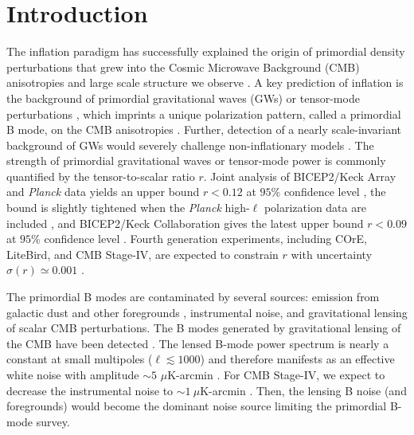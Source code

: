 \documentclass[iop,apj, numberedappendix]{emulateapj}
\def\Planck{\emph{Planck} }
\begin{document}
\section{Introduction}
\label{sec:intro}
The inflation paradigm has successfully explained the origin of primordial density
perturbations that grew into the Cosmic Microwave Background (CMB) anisotropies and large scale structure we
observe \citep[e.g.][]{Mukhanov1981, Guth1981, Linde1982, Albrecht1982, Lidsey1997, Lyth1999}.
A key prediction of inflation is the background of primordial
gravitational waves (GWs) or tensor-mode perturbations
\citep[e.g.][]{Starobinskii1979, Rubakov1982, Fabbri1983, Abbott1984, Starobinskii1985},
which imprints a unique polarization pattern,
called a primordial B mode, on the CMB anisotropies
\citep{Stebbins1996, Kamionkowski1997a, Kamionkowski1997, Seljak1997, Seljak1997a,Zaldarriaga1997a}.
Further, detection of a nearly scale-invariant background of GWs would severely challenge
non-inflationary models \citep[e.g.][]{Khoury2001, Khoury2001a,Khoury2003a,Steinhardt2002, Boyle2004a}.
The strength of primordial gravitational waves or tensor-mode power is commonly quantified by
the tensor-to-scalar ratio $r$.
Joint analysis of BICEP2/Keck Array and \Planck data yields an upper bound
$r < 0.12$ at $95\%$ confidence level \citep{BICEP2/Keck2015},
the bound is slightly tightened  when the \Planck high-$\ell$ polarization data are included
\citep{PlanckCollaborationXX2015},
and BICEP2/Keck Collaboration gives the latest upper bound $r < 0.09$ at $95\%$ confidence level \citep{BICEP2/Keck2016}.
Fourth generation experiments,
including COrE, LiteBird, and CMB Stage-IV,  are expected to
constrain $r$ with uncertainty $\sigma(r)\simeq 0.001$ \citep{COrECollaboration2011, LiteBirdCollaboration2014,
LiteBird2016, s42016,Cabass2016, Kamionkowski2016, Delabrouille2017}.

The primordial B modes are contaminated by several sources:
emission from galactic dust and other foregrounds
\citep{Hildebrand1999, Draine2004, Benoit2004, Page2007, Flauger2014, Mortonson2014, Niemack2015,
PlanckCollaborationXXX2016, PlanckCollaborationL2016, Krachmalnicoff2016},
instrumental noise, and gravitational lensing of scalar CMB perturbations.
The B modes generated by gravitational lensing of the CMB have  been detected
\citep{Hanson2013, Ade2014, VanEngelen2014, Story2014, BICEP2/Keck2015, PlanckCollaboration2015a}.
The lensed B-mode power spectrum is nearly a constant at small multipoles ($\ell \lesssim 1000$) and
therefore manifests as an effective white noise with amplitude $\sim 5$ $\mu$K-arcmin \citep{Lewis2006, Sherwin2015}.
For CMB Stage-IV, we expect to decrease the instrumental noise to $\sim 1\ \mu$K-arcmin \citep{s42016}.
Then, the lensing B noise (and foregrounds) would become the dominant noise source
limiting the primordial B-mode survey.
\end{document}
